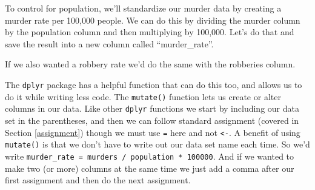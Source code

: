 \documentclass[
]{krantz}
\makeatletter
\newenvironment{Shaded}{\begin{snugshade}}{\end{snugshade}}
\newcommand{\DecValTok}[1]{\textcolor[rgb]{0.06,0.06,0.06}{#1}}
\newcommand{\NormalTok}[1]{#1}
\newcommand{\OtherTok}[1]{\textcolor[rgb]{0.37,0.37,0.37}{#1}}
\newcommand{\SpecialCharTok}[1]{\textcolor[rgb]{0,0,0}{#1}}
\newenvironment{kframe}{%
\medskip{}
\setlength{\fboxsep}{.8em}
 \def\at@end@of@kframe{}%
 \ifinner\ifhmode%
  \def\at@end@of@kframe{\end{minipage}}%
  \begin{minipage}{\columnwidth}%
 \fi\fi%
 \def\FrameCommand##1{\hskip\@totalleftmargin \hskip-\fboxsep
 \colorbox{shadecolor}{##1}\hskip-\fboxsep
     \hskip-\linewidth \hskip-\@totalleftmargin \hskip\columnwidth}%
 \MakeFramed {\advance\hsize-\width
   \@totalleftmargin\z@ \linewidth\hsize
   \@setminipage}}%
 {\par\unskip\endMakeFramed%
 \at@end@of@kframe}
\renewenvironment{Shaded}{\begin{kframe}}{\end{kframe}}
\makeatother
\begin{document}
To control for population, we'll standardize our murder data by creating a murder rate per 100,000 people. We can do this by dividing the murder column by the population column and then multiplying by 100,000. Let's do that and save the result into a new column called ``murder\_rate''.

\begin{Shaded}
\end{Shaded}

If we also wanted a robbery rate we'd do the same with the robberies column.

\begin{Shaded}
\end{Shaded}

The \texttt{dplyr} package has a helpful function that can do this too, and allows us to do it while writing less code. The \texttt{mutate()} function lets us create or alter columns in our data. Like other \texttt{dplyr} functions we start by including our data set in the parentheses, and then we can follow standard assignment (covered in Section \ref{assignment}) though we must use \texttt{=} here and not \texttt{\textless{}-}. A benefit of using \texttt{mutate()} is that we don't have to write out our data set name each time. So we'd write \texttt{murder\_rate\ =\ murders\ /\ population\ *\ 100000}. And if we wanted to make two (or more) columns at the same time we just add a comma after our first assignment and then do the next assignment.
\end{document}
